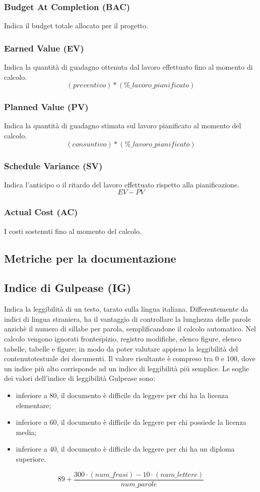 \subsubsection{Budget At Completion (BAC)}
Indica il budget totale allocato per il progetto.

\subsubsection{Earned Value (EV)}
Indica la quantità di guadagno ottenuta dal lavoro effettuato fino al momento di calcolo.
\[
    (preventivo)*(\%\_lavoro\_pianificato)
\]

\subsubsection{Planned Value (PV)}
Indica la quantità di guadagno stimata sul lavoro pianificato al momento del calcolo.
\[
    (consuntivo)*(\%\_lavoro\_pianificato)
\]

\subsubsection{Schedule Variance (SV)}
Indica l'anticipo o il ritardo del lavoro effettuato rispetto alla pianificazione.
\[
    EV - PV
\]

\subsubsection{Actual Cost (AC)}
I costi sostenuti fino al momento del calcolo.


\subsection{Metriche per la documentazione}

\subsection{Indice di Gulpease (IG)}
Indica la leggibilità di un testo, tarato sulla lingua italiana. Differentemente da indici di lingua straniera, ha il vantaggio di controllare la lunghezza delle parole anzichè il numero di sillabe per parola, semplificandone il calcolo automatico. 
Nel calcolo vengono ignorati frontespizio, registro modifiche, elenco figure, elenco tabelle, tabelle e figure; in modo da poter valutare appieno la leggibilità del contenutotestuale dei documenti.
Il valore risultante è compreso tra 0 e 100, dove un indice più alto corrisponde ad un indice di leggibilità più semplice.
Le soglie dei valori dell’indice di leggibilità Gulpease sono:
\begin{itemize}
    \item inferiore a 80, il documento è difficile da leggere per chi ha la licenza elementare;
    \item inferiore a 60, il documento è difficile da leggere per chi possiede la licenza media;
    \item inferiore a 40, il documento è difficile da leggere per chi ha un diploma superiore.
\end{itemize}
\[
    89+ \frac{300\cdot (num\_frasi) - 10\cdot (num\_lettere)}{num\_parole}
\]

